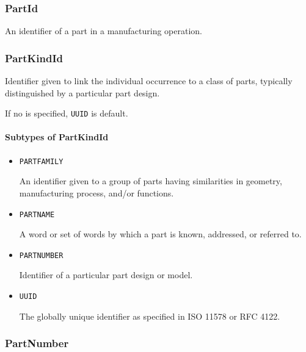 \subsubsection{PartId}
\label{sec:PartId}



An identifier of a part in a manufacturing operation.



\subsubsection{PartKindId}
\label{sec:PartKindId}



Identifier given to link the individual occurrence to a class of parts, typically distinguished by a particular part design. 

If no  is specified, \texttt{UUID} is default.



\paragraph{Subtypes of PartKindId}\mbox{}
\label{sec:Subtypes of PartKindId}

\begin{itemize}

\item \texttt{PART\textunderscore FAMILY}


An identifier given to a group of parts having similarities in geometry, manufacturing process, and/or functions.

\item \texttt{PART\textunderscore NAME}


A word or set of words by which a part is known, addressed, or referred to.

\item \texttt{PART\textunderscore NUMBER}


Identifier of a particular part design or model.

\item \texttt{UUID}


The globally unique identifier as specified in ISO 11578 or RFC 4122.


\end{itemize}







\subsubsection{PartNumber}
\label{sec:PartNumber}



